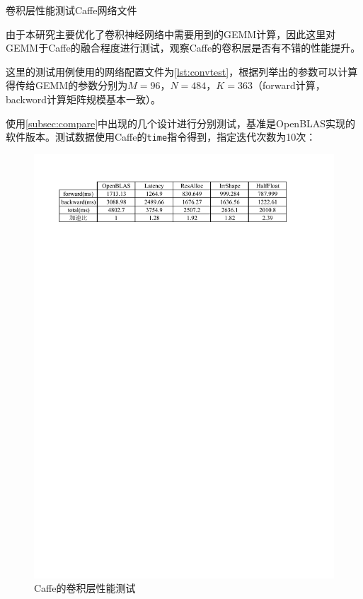 \begin{listing}[!ht]

\caption{卷积层性能测试Caffe网络文件}
\label{lst:convtest}
\end{listing}

由于本研究主要优化了卷积神经网络中需要用到的GEMM计算，因此这里对GEMM于Caffe的融合程度进行测试，观察Caffe的卷积层是否有不错的性能提升。

这里的测试用例使用的网络配置文件为\ref{lst:convtest}，根据列举出的参数可以计算得传给GEMM的参数分别为$M=96$，$N=484$，$K=363$（forward计算，backword计算矩阵规模基本一致）。

使用\ref{subsec:compare}中出现的几个设计进行分别测试，基准是OpenBLAS实现的软件版本。测试数据使用Caffe的\texttt{time}指令得到，指定迭代次数为10次：
\begin{figure}[!ht]
	\centering	
	\includegraphics[width=\textwidth]{assets/imgs/caffeconv.pdf}
	\caption{Caffe的卷积层性能测试}
	\label{fig:caffeconv}
\end{figure}

